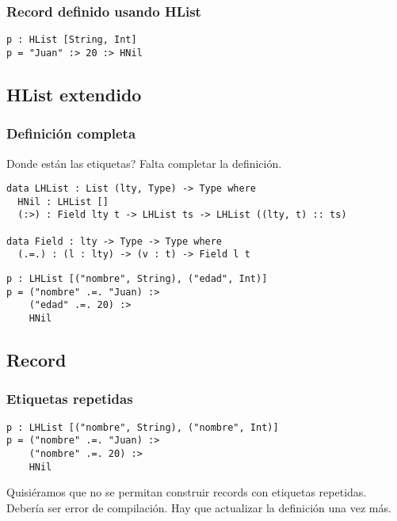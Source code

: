 \documentclass{beamer}
\begin{document}
\begin{frame}[fragile]
\frametitle{Record definido usando HList}

\begin{example}
\begin{verbatim}
p : HList [String, Int]
p = "Juan" :> 20 :> HNil
\end{verbatim}
\end{example}

\end{frame}

\subsection{HList extendido}

\begin{frame}[fragile]
\frametitle{Definición completa}

Donde están las etiquetas? Falta completar la definición.

\pause

\begin{example}
\begin{verbatim}
data LHList : List (lty, Type) -> Type where
  HNil : LHList []
  (:>) : Field lty t -> LHList ts -> LHList ((lty, t) :: ts)

data Field : lty -> Type -> Type where
  (.=.) : (l : lty) -> (v : t) -> Field l t
\end{verbatim}
\end{example}

\pause

\begin{example}
\begin{verbatim}
p : LHList [("nombre", String), ("edad", Int)]
p = ("nombre" .=. "Juan) :> 
    ("edad" .=. 20) :> 
    HNil
\end{verbatim}
\end{example}

\end{frame}

\subsection{Record}

\begin{frame}[fragile]
\frametitle{Etiquetas repetidas}

\begin{example}
\begin{verbatim}
p : LHList [("nombre", String), ("nombre", Int)]
p = ("nombre" .=. "Juan) :> 
    ("nombre" .=. 20) :> 
    HNil
\end{verbatim}
\end{example}

\pause

Quisiéramos que no se permitan construir records con etiquetas repetidas. Debería ser error de compilación.
Hay que actualizar la definición una vez más.

\end{frame}
\end{document}

